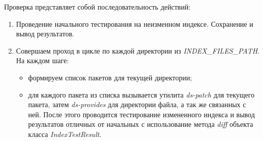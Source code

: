 Проверка представляет собой последовательность действий:\\
\begin{enumerate}
\item{Проведение начального тестирования на неизменном индексе. Сохранение
и вывод результатов.}
\item{Совершаем проход в цикле по каждой директории из \emph{INDEX\_FILES\_PATH}. На
каждом шаге:
	\begin{itemize}
	\item{формируем список пакетов для текущей директории;}
	\item{для каждого пакета из списка вызывается утилита \textit{ds-patch }
	для текущего пакета, затем \textit{ds-provides} для директории файла, а 
	так же связанных с ней. После этого проводится тестирование
	измененного индекса и вывод результатов отличных от начальных
	с использование метода \textit{diff} объекта класса \textit{IndexTestResult}.}
	\end{itemize}
}
\end{enumerate}







